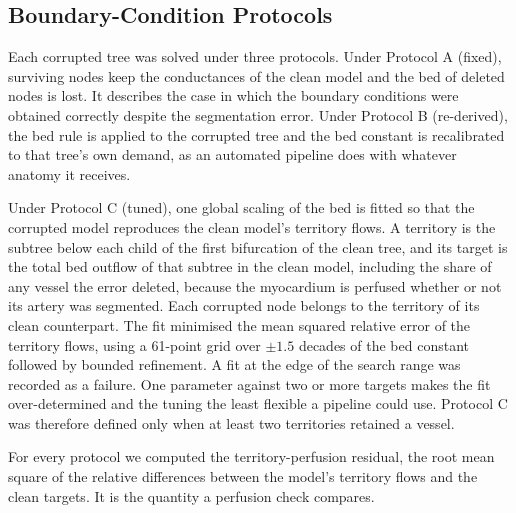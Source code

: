 \subsection{Boundary-Condition Protocols}
Each corrupted tree was solved under three protocols. Under Protocol A (fixed), surviving nodes keep the
conductances of the clean model and the bed of deleted nodes is lost. It describes the case in which the boundary
conditions were obtained correctly despite the segmentation error. Under Protocol B (re-derived), the bed rule is
applied to the corrupted tree and the bed constant is recalibrated to that tree's own demand, as an automated
pipeline does with whatever anatomy it receives.

Under Protocol C (tuned), one global scaling of the bed is fitted so that the corrupted model reproduces the clean
model's territory flows. A territory is the subtree below each child of the first bifurcation of the clean tree, and
its target is the total bed outflow of that subtree in the clean model, including the share of any vessel the error
deleted, because the myocardium is perfused whether or not its artery was segmented. Each corrupted node belongs to
the territory of its clean counterpart. The fit minimised the mean squared relative error of the territory flows,
using a 61-point grid over $\pm 1.5$ decades of the bed constant followed by bounded refinement. A fit at the edge of
the search range was recorded as a failure. One parameter against two or more targets makes the fit over-determined
and the tuning the least flexible a pipeline could use. Protocol C was therefore defined only when at least two
territories retained a vessel.

For every protocol we computed the territory-perfusion residual, the root mean square of the relative differences
between the model's territory flows and the clean targets. It is the quantity a perfusion check compares.

